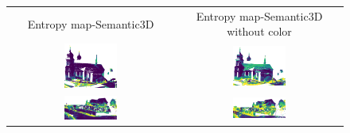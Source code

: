     \begin{figure}[h!]
        \centering
        \begin{tabular}{cc}
            Entropy map-Semantic3D & Entropy map-Semantic3D without color \\
            \includegraphics[width=0.33\textwidth, height=0.18\textheight]{images/ood_imgs/fout_sem3d/fout_ent_1.pdf}&
            \includegraphics[width=0.33\textwidth, height=0.18\textheight]{images/sem3d_of/fout_ent_sem3d_of_1.pdf}\\

            \includegraphics[width=0.33\textwidth, height=0.18\textheight]{images/ood_imgs/fout_sem3d/fout_ent_2.pdf}&
            \includegraphics[width=0.33\textwidth, height=0.18\textheight]{images/sem3d_of/fout_ent_sem3d_of_2.pdf}\\


\end{tabular}
\end{figure}
